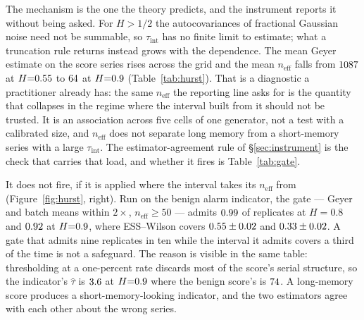 \documentclass[a4paper,fleqn]{cas-dc}
\newcommand{\neff}{n_{\mathrm{eff}}}
\begin{document}
The mechanism is the one the theory predicts, and the instrument reports it without being asked.
For $H>1/2$ the autocovariances of fractional Gaussian noise need not be summable, so
$\tau_{\mathrm{int}}$ has no finite limit to estimate; what a truncation rule returns instead grows
with the dependence. The mean Geyer estimate on the score series rises across the grid and the mean
$\neff$ falls from $1087$ at $H{=}0.55$ to $64$ at $H{=}0.9$
(Table~\ref{tab:hurst}). That is a diagnostic a practitioner already has: the same $\neff$ the
reporting line asks for is the quantity that collapses in the regime where the interval built from
it should not be trusted. It is an association across five cells of one generator, not a test with a
calibrated size, and $\neff$ does not separate long memory from a short-memory series with a large
$\tau_{\mathrm{int}}$. The estimator-agreement rule of \S\ref{sec:instrument} is the check that
carries that load, and whether it fires is Table~\ref{tab:gate}.

It does not fire, if it is applied where the interval takes its $\neff$ from
(Figure~\ref{fig:hurst}, right). Run on the benign
alarm indicator, the gate --- Geyer and batch means within $2\times$, $\neff\ge50$ --- admits
$0.99$ of replicates at $H{=}0.8$ and $0.92$ at $H{=}0.9$, where
ESS--Wilson covers $0.55\pm0.02$ and $0.33\pm0.02$. A gate that admits nine replicates in ten while
the interval it admits covers a third of the time is not a safeguard. The reason is visible in the
same table: thresholding at a one-percent rate discards most of the score's serial structure, so the
indicator's $\hat\tau$ is $3.6$ at $H{=}0.9$ where the benign score's is
$74$. A long-memory score produces a short-memory-looking indicator, and the two
estimators agree with each other about the wrong series.
\end{document}
